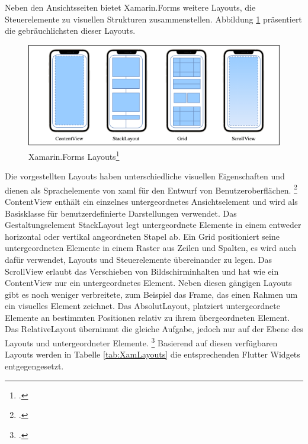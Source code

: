 Neben den Ansichtsseiten bietet Xamarin.Forms weitere Layouts,  die Steuerelemente zu visuellen Strukturen zusammenstellen.  Abbildung \ref{fig:Xamarin.Forms Layouts} präsentiert die gebräuchlichsten dieser Layouts. 

\begin{figure}[!ht]
 \includegraphics[width=\textwidth,height=\textheight,keepaspectratio]{Images/CrossPlattformFrameworks/XamarinFormsLayouts.png}
 \caption[Xamarin.Forms Layouts]{Xamarin.Forms Layouts\footcite{MicrosoftXamViews2020}}
 \label{fig:Xamarin.Forms Layouts}
\end{figure}

Die vorgestellten Layouts haben  unterschiedliche visuellen Eigenschaften und dienen als Sprachelemente von \ac{xaml} für den Entwurf von Benutzeroberflächen.  \footcitetext[Abbildung in Anlehnung an][Abgerufen am \today]{MicrosoftXamLayouts2018} \glq ContentView\grq{} enthält ein einzelnes untergeordnetes Ansichtselement und wird als Basisklasse für benutzerdefinierte Darstellungen verwendet.  Das Gestaltungselement \glq StackLayout\grq{} legt untergeordnete Elemente in einem entweder horizontal oder vertikal angeordneten Stapel ab.  Ein \glq Grid\grq{} positioniert seine untergeordneten Elemente in einem Raster aus Zeilen und Spalten,  es wird auch dafür verwendet,  Layouts und Steuerelemente übereinander zu legen.  Das \glq ScrollView\grq{} erlaubt das Verschieben von Bildschirminhalten und hat wie ein \glq ContentView\grq{} nur ein untergeordnetes Element.  
Neben diesen gängigen Layouts gibt es noch weniger verbreitete,  zum Beispiel  das \glq  Frame\grq{}, das einen Rahmen um ein visuelles Element zeichnet.  Das \glq AbsolutLayout\grq{},  platziert untergeordnete Elemente an bestimmten Positionen relativ zu ihrem übergeordneten Element.  Das \glq RelativeLayout\grq{} übernimmt die gleiche Aufgabe,  jedoch nur auf der Ebene des Layouts und untergeordneter Elemente. \footcite[Vgl.][Abgerufen am \today]{MicrosoftXamLayouts2018} Basierend auf diesen verfügbaren Layouts werden in Tabelle \ref{tab:XamLayouts} die entsprechenden Flutter Widgets entgegengesetzt.  

